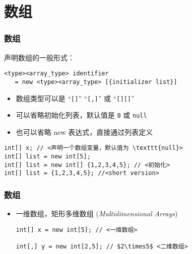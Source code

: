 \section{数组}

\begin{frame}[fragile]
\frametitle{数组}
声明数组的一般形式：
\begin{lstlisting}
<type><array_type> identifier
   = new <type><array_type> [{initializer list}]
\end{lstlisting}
\begin{itemize}
\item 数组类型可以是 ``\texttt{[]}'' ``\texttt{[,]}'' 或 ``\texttt{[][]}''
\item 可以省略初始化列表，默认值是 {\redwarn\texttt{0}} 或 {\redwarn\texttt{null}}
\item 也可以省略 new 表达式，直接通过列表定义
\end{itemize}
\pause
\begin{lstlisting}[escapeinside=<>]
int[] x; // <声明一个数组变量，默认值为 \texttt{null}>
int[] list = new int[5];
int[] list = new int[] {1,2,3,4,5}; // <初始化>
int[] list = {1,2,3,4,5}; //<short version>
\end{lstlisting}
\end{frame}

\begin{frame}[fragile]
\frametitle{数组}
\begin{itemize}
\item 一维数组，矩形多维数组 (\textit{Multidimensional Arrays})
\begin{lstlisting}[escapeinside=<>,mathescape]
int[] x = new int[5]; // <一维数组>

int[,] y = new int[2,5]; // $2\times5$ <二维数组>
\end{lstlisting}
\end{itemize} \pause

  \begin{figure}[h] \label<1| handout:1>{fig:cs-array-mul} \centering
    
  \end{figure}
\end{frame}


